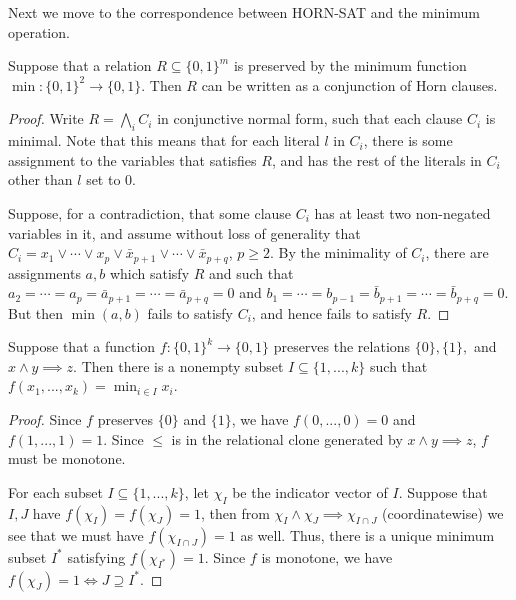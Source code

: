 \documentclass[letterpaper,11pt]{article}
\begin{document}
Next we move to the correspondence between HORN-SAT and the minimum operation.

\begin{thm} Suppose that a relation $R \subseteq \{0,1\}^m$ is preserved by the minimum function $\min : \{0,1\}^2 \rightarrow \{0,1\}$. Then $R$ can be written as a conjunction of Horn clauses.
\end{thm}
\begin{proof} Write $R = \bigwedge_i C_i$ in conjunctive normal form, such that each clause $C_i$ is minimal. Note that this means that for each literal $l$ in $C_i$, there is some assignment to the variables that satisfies $R$, and has the rest of the literals in $C_i$ other than $l$ set to $0$.

Suppose, for a contradiction, that some clause $C_i$ has at least two non-negated variables in it, and assume without loss of generality that $C_i = x_1 \vee \cdots \vee x_p \vee \bar{x}_{p+1} \vee \cdots \vee \bar{x}_{p+q}$, $p \ge 2$. By the minimality of $C_i$, there are assignments $a, b$ which satisfy $R$ and such that $a_2 = \cdots = a_p = \bar{a}_{p+1} = \cdots = \bar{a}_{p+q} = 0$ and $b_1 = \cdots = b_{p-1} = \bar{b}_{p+1} = \cdots = \bar{b}_{p+q} = 0$. But then $\min(a,b)$ fails to satisfy $C_i$, and hence fails to satisfy $R$.
\end{proof}

\begin{thm} Suppose that a function $f : \{0,1\}^k \rightarrow \{0,1\}$ preserves the relations $\{0\}, \{1\},$ and $x\wedge y \implies z$. Then there is a nonempty subset $I \subseteq \{1, ..., k\}$ such that $f(x_1, ..., x_k) = \min_{i \in I} x_i$.
\end{thm}
\begin{proof} Since $f$ preserves $\{0\}$ and $\{1\}$, we have $f(0,...,0) = 0$ and $f(1, ..., 1) = 1$. Since $\le$ is in the relational clone generated by $x \wedge y \implies z$, $f$ must be monotone.

For each subset $I \subseteq \{1, ..., k\}$, let $\chi_I$ be the indicator vector of $I$. Suppose that $I,J$ have $f(\chi_I) = f(\chi_J) = 1$, then from $\chi_I \wedge \chi_J \implies \chi_{I\cap J}$ (coordinatewise) we see that we must have $f(\chi_{I\cap J}) = 1$ as well. Thus, there is a unique minimum subset $I^*$ satisfying $f(\chi_{I^*}) = 1$. Since $f$ is monotone, we have $f(\chi_J) = 1 \iff J \supseteq I^*$.
\end{proof}
\end{document}
